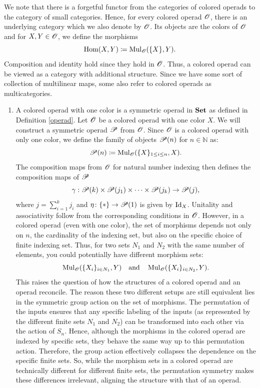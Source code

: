 \begin{rem}
    We note that there is a forgetful functor from the categories of colored
    operads to the category of small categories. Hence, for every colored operad
    $\O$, there is an underlying category which we also denote by $\O$. Its
    objects are the colors of $\O$ and for $X, Y \in \O$, we define the
    morphisms 
    \[
    \Hom(X,Y) \coloneqq \Mul_{\O}(\{X\}, Y).
    \]
    Composition and identity hold since they hold in $\O$. Thus, a colored
    operad can be viewed as a category with additional structure. Since we have
    some sort of collection of multilinear maps, some also refer to colored
    operads as multicategories.
\end{rem}

\begin{egs}
    \begin{enumerate}
        \item A colored operad with one color is a symmetric operad in $\Set$ as
        defined in Definition \ref{operad}. Let $\O$ be a colored operad with
        one color $X$. We will construct a symmetric operad $\P$ from $\O$.
        Since $\O$ is a colored operad with only one color, we define the family
        of objects $\P(n)$ for $n \in \mathbb{N}$ as:
        \[
            \P(n) \coloneqq \Mul_{\O}(\{X\}_{1\leq i \leq n}, X).
        \]
        The composition maps from $\O$ for natural number indexing then defines
        the composition maps of $\P$ 
        \[
            \gamma: \P(k) \times \P(j_1) \times \cdots \times \P(j_k) \to \P(j),
        \]
        where $j = \sum_{i=1}^k j_i$ and $\eta \colon \{\ast\} \to \P(1)$ is
        given by $\id_X$. Unitality and associativity follow from the
        corresponding conditions in $\O$. However, in a colored operad (even
        with one color), the set of morphisms depends not only on $n$, the
        cardinality of the indexing set, but also on the specific choice of
        finite indexing set. Thus, for two sets $N_1$ and $N_2$ with the same
        number of elements, you could potentially have different morphism sets:
        \[
        \Mul_{\O}(\{X_i\}_{i \in N_1}, Y) \quad \text{and} \quad \Mul_{\O}(\{X_i\}_{i \in N_2}, Y).
        \]
        This raises the question of how the structures of a colored operad and
        an operad reconcile. The reason these two different setups are still
        equivalent lies in the symmetric group action on the set of morphisms.
        The permutation of the inputs ensures that any specific labeling of the
        inputs (as represented by the different finite sets $N_1$ and $N_2$) can
        be transformed into each other via the action of $S_n$. Hence, although
        the morphisms in the colored operad are indexed by specific sets, they
        behave the same way up to this permutation action. Therefore, the group
        action effectively collapses the dependence on the specific finite sets.
        So, while the morphism sets in a colored operad are technically
        different for different finite sets, the permutation symmetry makes
        these differences irrelevant, aligning the structure with that of an
        operad.
    

\end{enumerate}
\end{egs}
